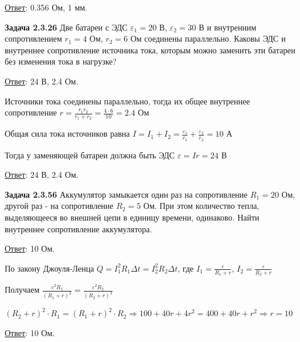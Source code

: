 \documentclass[12pt]{article}
\begin{document}
\bigvspace

\underline{Ответ}: 0.356 Ом, 1 мм.

\begin{tcolorbox}
    \textbf{Задача 2.3.26} Две батареи с ЭДС $\varepsilon_1 = 20$ В, $\varepsilon_2 = 30$ В и внутренним
    сопротивлением $r_1 = 4$ Ом, $r_2 = 6$ Ом соединены параллельно. Каковы
    ЭДС и внутреннее сопротивление источника тока, которым можно заменить 
    эти батареи без изменения тока в нагрузке?

    \begin{UpsideDown}
        \footnotesize
        \underline{Ответ}: 24 В, 2.4 Ом.
    \end{UpsideDown}
\end{tcolorbox}

Источники тока соединены параллельно, тогда их общее внутреннее сопротивление $r = \frac{r_1 r_2}{r_1 + r_2} = \frac{4 \cdot 6}{10}= 2.4$ Ом

Общая сила тока источников равна $I = I_1 + I_2 = \frac{\varepsilon_1}{r_1} + \frac{\varepsilon_2}{r_2} = 10$ А

Тогда у заменяющей батареи должна быть ЭДС $\varepsilon = Ir = 24$ В

\bigvspace

\underline{Ответ}: $24$ В, $2.4$ Ом.


\begin{tcolorbox}
    \textbf{Задача 2.3.56} Аккумулятор замыкается один раз на сопротивление $R_1 = 20$ Ом, 
    другой раз - на сопротивление $R_2 = 5$ Ом. При этом количество
    тепла, выделяющееся во внешней цепи в единицу времени, одинаково.
    Найти внутреннее сопротивление аккумулятора.
    
    \begin{UpsideDown}
        \footnotesize
        \underline{Ответ}: 10 Ом.
    \end{UpsideDown}
\end{tcolorbox}

По закону Джоуля-Ленца $Q = I_1^2 R_1 \Delta t = I_2^2 R_2 \Delta t$, где $I_1 = \frac{\varepsilon}{R_1 + r}$, $I_2 = \frac{\varepsilon}{R_2 + r}$

Получаем $\frac{\varepsilon^2 R_1}{(R_1 + r)^2} = \frac{\varepsilon^2 R_2}{(R_2 + r)^2}$

$(R_2 + r)^2 \cdot R_1 = (R_1 + r)^2 \cdot R_2 \Longrightarrow 100 + 40r + 4r^2 = 400 + 40r + r^2 \Longrightarrow r = 10$

\bigvspace

\underline{Ответ}: 10 Ом.
\end{document}
